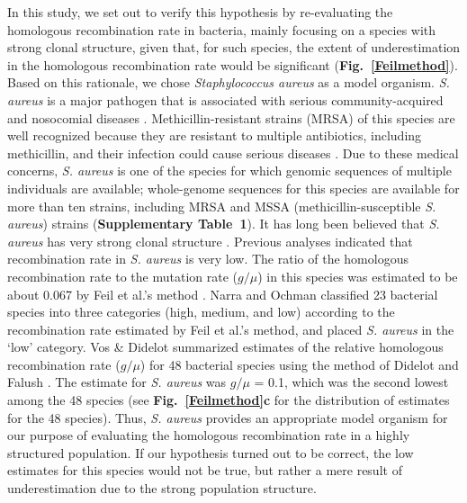 \documentclass[twoside,twocolumn, letterpaper]{article}
\begin{document}
 In this study, we set out to verify this hypothesis by re-evaluating the homologous recombination rate in bacteria, mainly focusing on 
 a species with strong clonal structure, given that, for such species, the extent of underestimation in the homologous recombination rate would be 
 significant  ({\bf Fig.~\ref{Feilmethod}}). Based on this rationale, we chose \emph{Staphylococcus aureus} as a model organism. \emph{S. aureus} is a major pathogen that is associated with serious community-acquired and nosocomial diseases \cite[]{Emori_1993_8269394,Steinberg_1996_49}. Methicillin-resistant strains (MRSA) of this species are well recognized because they are resistant to multiple antibiotics, including methicillin, and their infection could cause serious diseases \cite[]{Panlilio_1992_51,Speller_1997_52,Grubb_1998_50}. Due to these medical concerns, \emph{S. aureus} is one of the species for which genomic sequences of multiple individuals are available; whole-genome sequences for this species are available for more than ten strains, including MRSA and MSSA (methicillin-susceptible \emph{S. aureus}) strains ({\bf Supplementary Table~1}). It has long been believed that \emph{S. aureus} has very strong clonal structure \cite[]{Musser_1990_1967495,Musser_1992_53,Feil_2003_12754228,Cooper_2006_16622047}. Previous analyses indicated that recombination rate in \emph{S. aureus} is very low. The ratio of the homologous recombination rate to the mutation rate ($g/\mu$) in this species was estimated to be about 0.067 \cite[]{Feil_2003_12754228} by Feil et al.'s method \cite{Feil_1999_10555280,Feil_2000_10747043}. Narra and Ochman \cite[]{Narra_2006_16950097} classified 23 bacterial species into three categories (high, medium, and low) according to the recombination rate estimated by Feil et al.'s method, and placed \emph{S. aureus} 
 in the `low' category.
Vos \& Didelot \cite{Vos_2009_18830278} summarized estimates of the relative homologous recombination rate ($g/\mu$) for 48 bacterial species using the method of Didelot and Falush \cite[]{Didelot_2007_17151252}. The estimate for \emph{S. aureus} was $g/\mu$ = 0.1, which was the second lowest among the 48 species (see {\bf Fig.~\ref{Feilmethod}c} for the distribution of estimates for the 48 species). Thus, \emph{S. aureus} provides an appropriate model organism for our purpose of evaluating the homologous recombination rate in a highly structured population. 
 If our hypothesis turned out to be correct, the low estimates for this species would not be true, but rather a mere result of underestimation due 
  to the strong population structure. 
\end{document}
